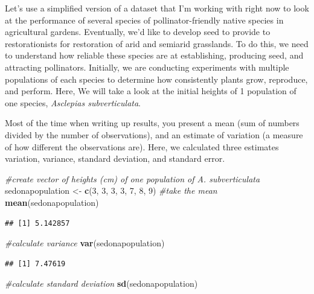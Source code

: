 \documentclass[
]{book}
\newenvironment{Shaded}{\begin{snugshade}}{\end{snugshade}}
\newcommand{\CommentTok}[1]{\textcolor[rgb]{0.56,0.35,0.01}{\textit{#1}}}
\newcommand{\DecValTok}[1]{\textcolor[rgb]{0.00,0.00,0.81}{#1}}
\newcommand{\FunctionTok}[1]{\textcolor[rgb]{0.13,0.29,0.53}{\textbf{#1}}}
\newcommand{\NormalTok}[1]{#1}
\newcommand{\OtherTok}[1]{\textcolor[rgb]{0.56,0.35,0.01}{#1}}
\begin{document}
Let's use a simplified version of a dataset that I'm working with right now to look at the performance of several species of pollinator-friendly native species in agricultural gardens. Eventually, we'd like to develop seed to provide to restorationists for restoration of arid and semiarid grasslands. To do this, we need to understand how reliable these species are at establishing, producing seed, and attracting pollinators. Initially, we are conducting experiments with multiple populations of each species to determine how consistently plants grow, reproduce, and perform. Here, We will take a look at the initial heights of 1 population of one species, \emph{Asclepias subverticulata}.

Most of the time when writing up results, you present a mean (sum of numbers divided by the number of observations), and an estimate of variation (a measure of how different the observations are). Here, we calculated three estimates variation, variance, standard deviation, and standard error.

\begin{Shaded}
\begin{Highlighting}[]
\CommentTok{\#create vector of heights (cm) of one population of A. subverticulata}
\NormalTok{sedonapopulation }\OtherTok{\textless{}{-}} \FunctionTok{c}\NormalTok{(}\DecValTok{3}\NormalTok{, }\DecValTok{3}\NormalTok{, }\DecValTok{3}\NormalTok{, }\DecValTok{3}\NormalTok{, }\DecValTok{7}\NormalTok{, }\DecValTok{8}\NormalTok{, }\DecValTok{9}\NormalTok{)}
\CommentTok{\#take the mean}
\FunctionTok{mean}\NormalTok{(sedonapopulation)}
\end{Highlighting}
\end{Shaded}

\begin{verbatim}
## [1] 5.142857
\end{verbatim}

\begin{Shaded}
\begin{Highlighting}[]
\CommentTok{\#calculate variance}
\FunctionTok{var}\NormalTok{(sedonapopulation)}
\end{Highlighting}
\end{Shaded}

\begin{verbatim}
## [1] 7.47619
\end{verbatim}

\begin{Shaded}
\begin{Highlighting}[]
\CommentTok{\#calculate standard deviation}
\FunctionTok{sd}\NormalTok{(sedonapopulation)}
\end{Highlighting}
\end{Shaded}
\end{document}
